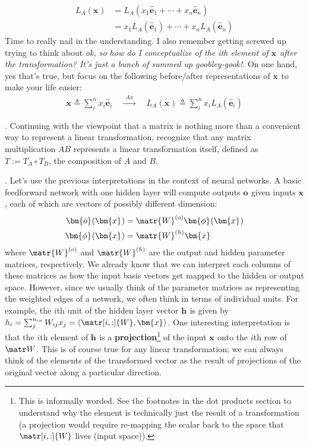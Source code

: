\documentclass[11pt]{article}
\renewcommand\vec[2][]{\bm{#2}_{#1}}
\newcommand\myspace[1][]{\vspace{#1\bigskipamount}}
\newcommand\p{\Needspace{10\baselineskip} \noindent}
\begin{document}
\begin{align}
	L_A(\vec x)
		&= L_A(x_1 \vec[1]{\hat e} + \cdots + x_n \vec[n]{\hat e}) \\
		&= x_1 L_A(\vec[1]{\hat e}) + \cdots + x_n L_A(\vec[n]{\hat e})
\end{align}
Time to really nail in the understanding. I also remember getting screwed up trying to think about \textit{ok, so how do I conceptualize of the ith element of $\vec x$ \textit{after} the transformation? It's just a bunch of summed up goobley-gook!}. On one hand, yes that's true, but focus on the following before/after representations of $\vec x$ to make your life easier:
\begin{align}
	\vec{x} {\triangleq} \sum_i^n x_i \vec[i]{\hat e}
	\quad \xrightarrow{~~ Ax ~~} \quad
	L_A(\vec x) {\triangleq} \sum_i^n x_i L_A(\vec[i]{\hat e})
\end{align}

\myspace
{}. Continuing with the viewpoint that a matrix is nothing more than a convenient way to represent a linear transformation, recognize that any matrix multiplication $A B$ represents a linear transformation itself, defined as $T := T_A \circ T_B$, the composition of $A$ and $B$. 

\myspace
\p {}. Let's use the previous interpretations in the context of neural networks. A basic feedforward network with one hidden layer will compute outputs $\vec o$ given inputs $\vec x$, each of which are vectors of possibly different dimension:
\begin{align}
\vec{o}(\vec x) 
	&= \matr{W}^{(o)} \vec{\phi}(\vec x) \\
\vec{\phi}(\vec x)
	&= \matr{W}^{(h)} \vec x
\end{align}
where $\matr{W}^{(o)}$ and $\matr{W}^{(h)}$ are the output and hidden parameter matrices, respectively. We already know that we can interpret each columns of these matrices as how the input basis vectors get mapped to the hidden or output space. However, since we usually think of the parameter matrices as representing the weighted edges of a network, we often think in terms of individual units. For example, the $i$th unit of the hidden layer vector $\vec h$ is given by $h_i = \sum_j^{n_{in}} W_{ij} x_j = \langle \matr[i,:]{W} ,  \vec x \rangle$. One interesting interpretation is that the $i$th element of $\vec h$ is a \textbf{projection}\footnote{This is informally worded. See the footnotes in the dot products section to understand why the element is technically just the result of a transformation (a projection would require re-mapping the scalar back to the space that $\matr[i, :]{W}$ lives (input space)).} of the input $\vec x$ onto the $i$th row of $\matr W$. This is of course true for any linear transformation; we can always think of the elements of the transformed vector as the result of projections of the original vector along a particular direction.
\end{document}
